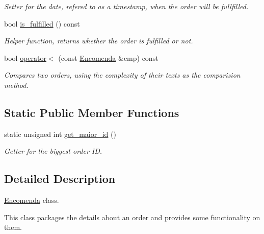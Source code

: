 \begin{DoxyCompactItemize}
\begin{DoxyCompactList}\small\item\em Setter for the date, refered to as a timestamp, when the order will be fullfilled. \end{DoxyCompactList}\item 
bool \hyperlink{class_encomenda_a0cd2e50cb794f8a698e406f861ebb5dc}{is\-\_\-fulfilled} () const 
\begin{DoxyCompactList}\small\item\em Helper function, returns whether the order is fulfilled or not. \end{DoxyCompactList}\item 
bool \hyperlink{class_encomenda_ae7ba8edcf79d77cfb4d9a359097b5e16}{operator$<$} (const \hyperlink{class_encomenda}{Encomenda} \&cmp) const 
\begin{DoxyCompactList}\small\item\em Compares two orders, using the complexity of their texts as the comparision method. \end{DoxyCompactList}\end{DoxyCompactItemize}
\subsection*{Static Public Member Functions}
\begin{DoxyCompactItemize}
\item 
static unsigned int \hyperlink{class_encomenda_a94777b2fe00d586c409b81167e6ee808}{get\-\_\-maior\-\_\-id} ()
\begin{DoxyCompactList}\small\item\em Getter for the biggest order I\-D. \end{DoxyCompactList}\end{DoxyCompactItemize}


\subsection{Detailed Description}
\hyperlink{class_encomenda}{Encomenda} class. 

This class packages the details about an order and provides some functionality on them. 

